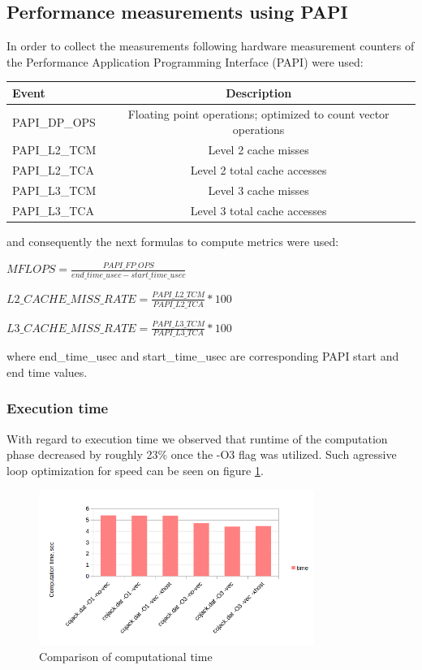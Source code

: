 \documentclass{article}
\begin{document}
\subsection{Performance measurements using PAPI}
In order to collect the measurements following hardware measurement counters of the Performance Application Programming Interface (PAPI) were used:\\
\begin{center}
\begin{tabular}{l|c}
	\hline
	Event & Description \\
	\hline
	PAPI\_DP\_OPS & Floating point operations; optimized to count vector operations \\
	PAPI\_L2\_TCM & Level 2 cache misses \\
	PAPI\_L2\_TCA & Level 2 total cache accesses \\
	PAPI\_L3\_TCM & Level 3 cache misses \\
	PAPI\_L3\_TCA & Level 3 total cache accesses \\
\end{tabular}
\end{center}
and consequently the next formulas to compute metrics were used:
\begin{center}
	$MFLOPS=\frac{PAPI\_FP\_OPS}{end\_time\_usec - start\_time\_usec}$
\end{center}
\begin{center}
	$L2\_CACHE\_MISS\_RATE=\frac{PAPI\_L2\_TCM}{PAPI\_L2\_TCA}*100$
\end{center}
\begin{center}
	$L3\_CACHE\_MISS\_RATE=\frac{PAPI\_L3\_TCM}{PAPI\_L3\_TCA}*100$
\end{center}
where end\_time\_usec and start\_time\_usec are corresponding PAPI start and end time values.

\subsubsection{Execution time}
With regard to execution time we observed that runtime of the computation phase decreased by roughly 23\% once the -O3 flag was utilized. Such agressive loop optimization for speed can be seen on figure \ref{fig:1}.
\begin{figure}[h!]
	\begin{center}
		\includegraphics[width=0.8\textwidth]{comp-time}
		\caption{Comparison of computational time}
		\label{fig:1}
	\end{center}
\end{figure}
\end{document}
